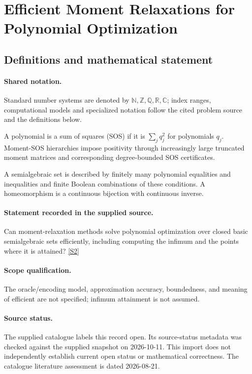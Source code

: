 \documentclass[11pt]{article}
\newcommand{\sref}[2]{\hyperlink{source:#1:#2}{[S#2]}}
\begin{document}
\section{Efficient Moment Relaxations for Polynomial Optimization}\label{statement}

\subsection{Definitions and mathematical statement}

\paragraph{Shared notation.}Standard number systems are denoted by $\mathbb N,\mathbb Z,\mathbb Q,\mathbb R,\mathbb C$; index ranges, computational models and specialized notation follow the cited problem source and the definitions below.


A polynomial is a sum of squares (SOS) if it is $\sum_j q_j^2$ for polynomials $q_j$. Moment-SOS hierarchies impose positivity through increasingly large truncated moment matrices and corresponding degree-bounded SOS certificates.

A semialgebraic set is described by finitely many polynomial equalities and inequalities and finite Boolean combinations of these conditions. A homeomorphism is a continuous bijection with continuous inverse.
\paragraph{Statement recorded in the supplied source.}
Can moment-relaxation methods solve polynomial optimization over closed basic semialgebraic sets efficiently, including computing the infimum and the points where it is attained? \sref{statement}{2}
\paragraph{Scope qualification.}
The oracle/encoding model, approximation accuracy, boundedness, and meaning of efficient are not specified; infimum attainment is not assumed.
\paragraph{Source status.}
The supplied catalogue labels this record open. Its source-status metadata was checked against the supplied snapshot on 2026-10-11. This import does not independently establish current open status or mathematical correctness. The catalogue literature assessment is dated 2026-08-21.
\end{document}
